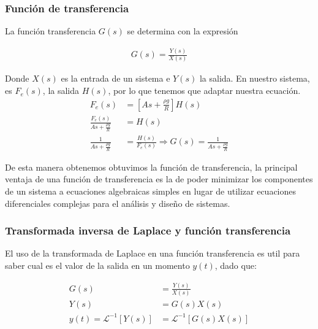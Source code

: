 \documentclass{article}
\begin{document}
\subsubsection*{Función de transferencia}

La función transferencia $G(s)$ se determina con la expresión

\begin{align*}
    G\left(s\right) = \frac{Y\left(s\right)}{X\left(s\right)}
\end{align*}

Donde $X\left(s\right)$ es la entrada de un sistema e $Y\left(s\right)$ la salida.
En nuestro sistema, es $F_e\left(s\right)$, la salida $H\left(s\right)$, por lo que tenemos que adaptar nuestra ecuación.
\begin{align*}
    F_e\left(s\right) &= \left[As + \frac{\rho g}{R}\right]H\left(s\right) \\
    \frac{F_e\left(s\right)}{As + \frac{\rho g}{R}} &= H\left(s\right) \\
    \frac{1}{As + \frac{\rho g}{R}} &= \frac{H\left(s\right)}{F_e\left(s\right)} \Rightarrow \boxed{G\left(s\right) = \frac{1}{As + \frac{\rho g}{R}}}
\end{align*}

De esta manera obtenemos obtuvimos la función de transferencia, la principal ventaja de una función de transferencia es la de poder minimizar los componentes de un sistema a ecuaciones algebraicas simples en lugar de utilizar ecuaciones diferenciales complejas para el análisis y diseño de sistemas.

\subsubsection*{Transformada inversa de Laplace y función transferencia}

El uso de la transformada de Laplace en una función transferencia es util para saber cual es el valor de la salida en un momento $y(t)$, dado que:

\begin{align*}
    G\left(s\right) &= \frac{Y\left(s\right)}{X\left(s\right)}\\
    Y\left(s\right) &= G\left(s\right)X\left(s\right)\\
    y\left(t\right) = \mathcal{L}^{-1}\left[Y\left(s\right)\right] &= \mathcal{L}^{-1} \left[G\left(s\right)X\left(s\right)\right]\\
\end{align*}
\end{document}
